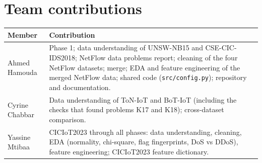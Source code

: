 \documentclass[12pt,a4paper]{article}
\begin{document}
\section{Team contributions}
\begin{table}[!htbp]\centering\small
\begin{tabular}{lL{11.8cm}}
\toprule
Member & Contribution \\
\midrule
Ahmed Hamouda & Phase 1; data understanding of UNSW-NB15 and CSE-CIC-IDS2018; NetFlow data problems report; cleaning of
the four NetFlow datasets; merge; EDA and feature engineering of the merged NetFlow data; shared code
(\texttt{src/config.py}); repository and documentation. \\
Cyrine Chabbar & Data understanding of ToN-IoT and BoT-IoT (including the checks that found problems K17 and K18);
cross-dataset comparison. \\
Yassine Mtibaa & CICIoT2023 through all phases: data understanding, cleaning, EDA (normality, chi-square, flag
fingerprints, DoS vs DDoS), feature engineering; CICIoT2023 feature dictionary. \\
\bottomrule
\end{tabular}
\end{table}
\end{document}
